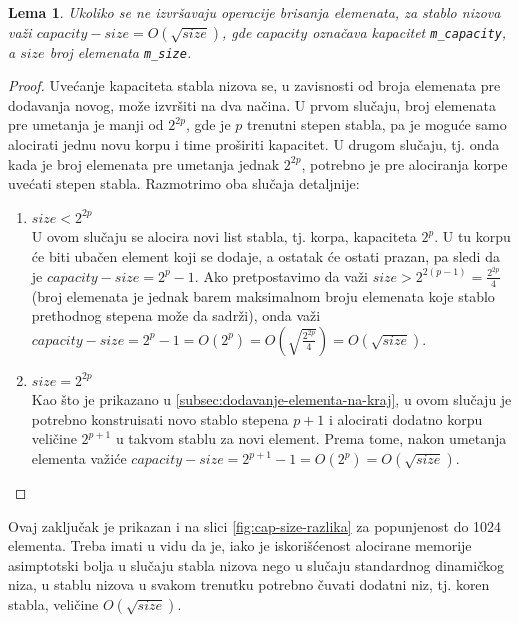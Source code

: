\documentclass[a4paper]{article}
\newtheorem{lemma}[theorem]{Lema}
\begin{document}
\begin{lemma}
Ukoliko se ne izvršavaju operacije brisanja elemenata, za stablo nizova važi $capacity - size = O(\sqrt{size})$, gde $capacity$ označava kapacitet \verb|m_capacity|, a $size$ broj elemenata \verb|m_size|.
\end{lemma}

\begin{proof}
Uvećanje kapaciteta stabla nizova se, u zavisnosti od broja elemenata pre dodavanja novog, može izvršiti na dva načina. U prvom slučaju, broj elemenata pre umetanja je manji od $2^{2p}$, gde je $p$ trenutni stepen stabla, pa je moguće samo alocirati jednu novu korpu i time proširiti kapacitet. U drugom slučaju, tj. onda kada je broj elemenata pre umetanja jednak $2^{2p}$, potrebno je pre alociranja korpe uvećati stepen stabla. Razmotrimo oba slučaja detaljnije:
\begin{enumerate}
    \item $size < 2^{2p}$\\
    U ovom slučaju se alocira novi list stabla, tj. korpa, kapaciteta $2^p$. U tu korpu će biti ubačen element koji se dodaje, a ostatak će ostati prazan, pa sledi da je $capacity - size = 2^p - 1$. Ako pretpostavimo da važi $size > 2^{2(p - 1)} = \frac{2^{2p}}{4}$ (broj elemenata je jednak barem maksimalnom broju elemenata koje stablo prethodnog stepena može da sadrži), onda važi $capacity - size = 2^p - 1 = O(2^{p}) = O(\sqrt{\frac{2^{2p}}{4}}) = O(\sqrt{size})$.
    \item $size = 2^{2p}$\\
    Kao što je prikazano u \ref{subsec:dodavanje-elementa-na-kraj}, u ovom slučaju je potrebno konstruisati novo stablo stepena $p + 1$ i alocirati dodatno korpu veličine $2^{p + 1}$ u takvom stablu za novi element. Prema tome, nakon umetanja elementa važiće $capacity - size = 2^{p + 1} - 1 = O(2^{p}) = O(\sqrt{size})$.
\end{enumerate}
\end{proof}

Ovaj zaključak je prikazan i na slici \ref{fig:cap-size-razlika} za popunjenost do 1024 elementa. Treba imati u vidu da je, iako je iskorišćenost alocirane memorije asimptotski bolja u slučaju stabla nizova nego u slučaju standardnog dinamičkog niza, u stablu nizova u svakom trenutku potrebno čuvati dodatni niz, tj. koren stabla, veličine $O(\sqrt{size})$.
\end{document}
